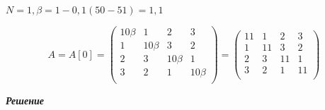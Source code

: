 \documentclass[12pt]{article}
\begin{document}
$N = 1, \beta = 1-0,1(50-51) = 1,1$

\begin{equation*}
	A = A[0] = \left(
	\begin{array}{cccc}
		10\beta & 1 & 2 & 3\\
		1 & 10\beta & 3 & 2\\
		2 & 3 & 10\beta & 1\\
		3 & 2 & 1 & 10\beta\\
	\end{array}
	\right)
	=
	\left(
	\begin{array}{cccc}
		11 & 1 & 2 & 3\\
		1 & 11 & 3 & 2\\
		2 & 3 & 11 & 1\\
		3 & 2 & 1 & 11\\
	\end{array}
	\right)
\end{equation*}
\begin{center}
	\textbf{\textit{Решение}}
\end{center}
\end{document}
